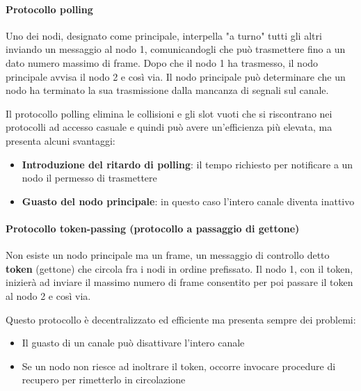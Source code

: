 \documentclass[11pt,a4paper]{article}
\begin{document}
{\paragraph{Protocollo polling}
Uno dei nodi, designato come principale, interpella "a turno" tutti gli altri inviando un messaggio al nodo 1, comunicandogli che può trasmettere fino a un dato numero massimo di frame. Dopo che il nodo 1 ha trasmesso, il nodo principale avvisa il nodo 2 e così via. Il nodo principale può determinare che un nodo ha terminato la sua trasmissione dalla mancanza di segnali sul canale.

Il protocollo polling elimina le collisioni e gli slot vuoti che si riscontrano nei protocolli ad accesso casuale e quindi può avere un'efficienza più elevata, ma presenta alcuni svantaggi:
\begin{itemize}
	\item \textbf{Introduzione del ritardo di polling}: il tempo richiesto per notificare a un nodo il permesso di trasmettere
	\item \textbf{Guasto del nodo principale}: in questo caso l'intero canale diventa inattivo
\end{itemize}

\paragraph{Protocollo token-passing (protocollo a passaggio di gettone)}
Non esiste un nodo principale ma un frame, un messaggio di controllo detto \textbf{token} (gettone) che circola fra i nodi in ordine prefissato. Il nodo 1, con il token, inizierà ad inviare il massimo numero di frame consentito per poi passare il token al nodo 2 e così via.

Questo protocollo è decentralizzato ed efficiente ma presenta sempre dei problemi:
\begin{itemize}
	\item Il guasto di un canale può disattivare l'intero canale
	\item Se un nodo non riesce ad inoltrare il token, occorre invocare procedure di recupero per rimetterlo in circolazione
\end{itemize} 

}
\end{document}
